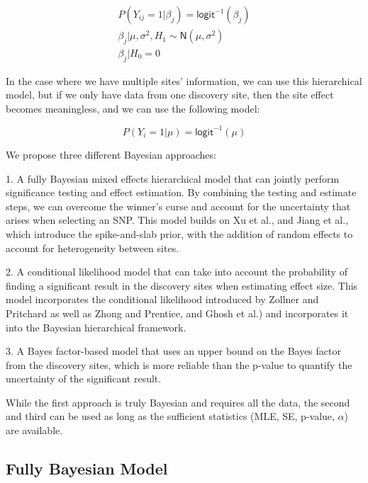 \documentclass[AMA,STIX1COL]{WileyNJD-v2}\usepackage[]{graphicx}\usepackage[]{color}
\begin{document}
\begin{gather}\label{eq1}
P(Y_{ij}=1| \beta_j) = \textsf{logit}^{-1}(\beta_{j})\\
\beta_{j}|\mu, \sigma^2,H_1 \sim \textsf{N}(\mu, \sigma^{2})\\
\beta_{j}|H_0 = 0
\end{gather}

In the case where we have multiple sites' information, we can use this hierarchical model, but if we only have data from one discovery site, then the site effect becomes meaningless, and we can use the following model:

\begin{equation}\label{eq2}
P(Y_{i}=1|\mu) = \textsf{logit}^{-1}(\mu)
\end{equation}

We propose three different Bayesian approaches: 

1. A fully Bayesian mixed effects hierarchical model that can jointly perform significance testing and effect estimation. By combining the testing and estimate steps, we can overcome the winner's curse and account for the uncertainty that arises when selecting an SNP. This model builds on Xu et al., and Jiang et al., which introduce the spike-and-slab prior, with the addition of random effects to account for heterogeneity between sites.

2. A conditional likelihood model that can take into account the probability of finding a significant result in the discovery sites when estimating effect size. This model incorporates the conditional likelihood introduced by Zollner and Pritchard as well as Zhong and Prentice, and Ghosh et al.)\cite{zollner2007overcoming, zhong2008bias, ghosh2008estimating} and incorporates it into the Bayesian hierarchical framework.

3. A Bayes factor-based model that uses an upper bound on the Bayes factor from the discovery sites, which is more reliable than the p-value \cite{benjamin2017redefine} to quantify the uncertainty of the significant result.

While the first approach is truly Bayesian and requires all the data, the second and third can be used as long as the sufficient statistics (MLE, SE, p-value, $\alpha$) are available. 


\subsection{Fully Bayesian Model}
\end{document}
